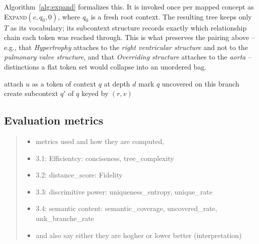 Algorithm~\ref{alg:expand} formalizes this. It is invoked once per mapped concept as \textsc{Expand}$(c, q_0, 0)$, where $q_0$ is a fresh root context. The resulting tree keeps only $T$ as its vocabulary; its subcontext structure records exactly which relationship chain each token was reached through. This is what preserves the pairing above -- e.g., that \emph{Hypertrophy} attaches to the \emph{right ventricular structure} and not to the \emph{pulmonary valve structure}, and that \emph{Overriding structure} attaches to the \emph{aorta} -- distinctions a flat token set would collapse into an unordered bag.

\begin{algorithm}[t]
\caption{\textsc{Expand}$(u, q, d)$}
\label{alg:expand}
\begin{algorithmic}[1]
        \State attach $u$ as a token of context $q$ at depth $d$
        \State \Return
    \EndIf
        \State mark $q$ uncovered on this branch
        \State \Return
    \EndIf
            \State {} 
        \Else
                \State create subcontext $q'$ of $q$ keyed by $(r, v)$
                \State {}
            \EndIf
        \EndIf
    \EndFor
\EndProcedure
\end{algorithmic}
\end{algorithm}





\subsection{Evaluation metrics}
\label{sec:method:metrics}

\begin{quote}\small\itshape
\begin{itemize}
\item metrics used and how they are computed,
\item 3.1: Efficientcy: conciseness, tree\_complexity
\item 3.2: distance\_score: Fidelity
\item 3.3: discrimitive power: uniqueness\_entropy, unique\_rate
\item 3.4: semantic content: semantic\_coverage, uncovered\_rate, unk\_branche\_rate
\item and also say either they are hogher or lower better (interpretation)
\end{itemize}
\end{quote}

